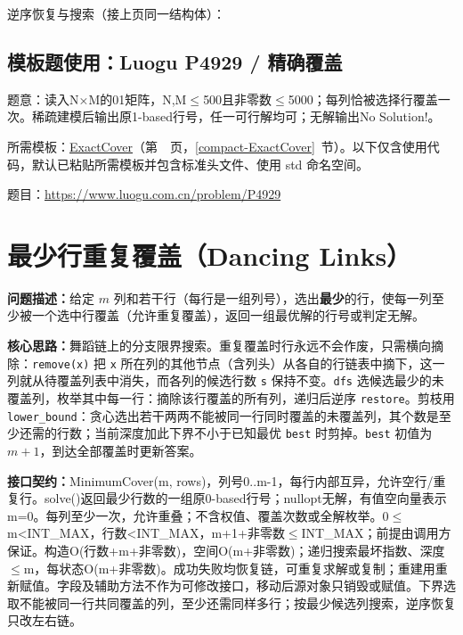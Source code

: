 \newpage

\noindent 逆序恢复与搜索（接上页同一结构体）：



\Needspace{410pt}

\subsection*{模板题使用：Luogu P4929 / 精确覆盖}

\label{usage-example-243}

题意：读入N×M的01矩阵，N,M$\le$500且非零数$\le$5000；每列恰被选择行覆盖一次。稀疏建模后输出原1-based行号，任一可行解均可；无解输出No Solution!。

所需模板：\hyperref[compact-ExactCover]{ExactCover}（第~\pageref{compact-ExactCover}~页，\ref{compact-ExactCover}~节）。以下仅含使用代码，默认已粘贴所需模板并包含标准头文件、使用 std 命名空间。

题目：\url{https://www.luogu.com.cn/problem/P4929}



\newpage

\Needspace{562pt}

\section{最少行重复覆盖（Dancing Links）}\label{compact-MinimumCover}

\noindent\textbf{问题描述：}\allowbreak 给定 $m$ 列和若干行（每行是一组列号），选出\textbf{最少}的行，使每一列至少被一个选中行覆盖（允许重复覆盖），返回一组最优解的行号或判定无解。

\textbf{核心思路：}\allowbreak 舞蹈链上的分支限界搜索。重复覆盖时行永远不会作废，只需横向摘除：\texttt{remove(x)} 把 \texttt{x} 所在列的其他节点（含列头）从各自的行链表中摘下，这一列就从待覆盖列表中消失，而各列的候选行数 \texttt{s} 保持不变。\texttt{dfs} 选候选最少的未覆盖列，枚举其中每一行：摘除该行覆盖的所有列，递归后逆序 \texttt{restore}。剪枝用 \texttt{lower\_bound}：贪心选出若干两两不能被同一行同时覆盖的未覆盖列，其个数是至少还需的行数；当前深度加此下界不小于已知最优 \texttt{best} 时剪掉。\texttt{best} 初值为 $m+1$，到达全部覆盖时更新答案。



{\sloppy{}\noindent\textbf{接口契约：}MinimumCover(m, rows)，列号0..m-1，每行内部互异，允许空行/重复行。solve()返回最少行数的一组原0-based行号；nullopt无解，有值空向量表示m=0。每列至少一次，允许重叠；不含权值、覆盖次数或全解枚举。0$\le$m<INT\_MAX，行数<INT\_MAX，m+1+非零数$\le$INT\_MAX；前提由调用方保证。构造O(行数+m+非零数)，空间O(m+非零数)；递归搜索最坏指数、深度$\le$m，每状态O(m+非零数)。成功失败均恢复链，可重复求解或复制；重建用重新赋值。字段及辅助方法不作为可修改接口，移动后源对象只销毁或赋值。下界选取不能被同一行共同覆盖的列，至少还需同样多行；按最少候选列搜索，逆序恢复只改左右链。\par}

